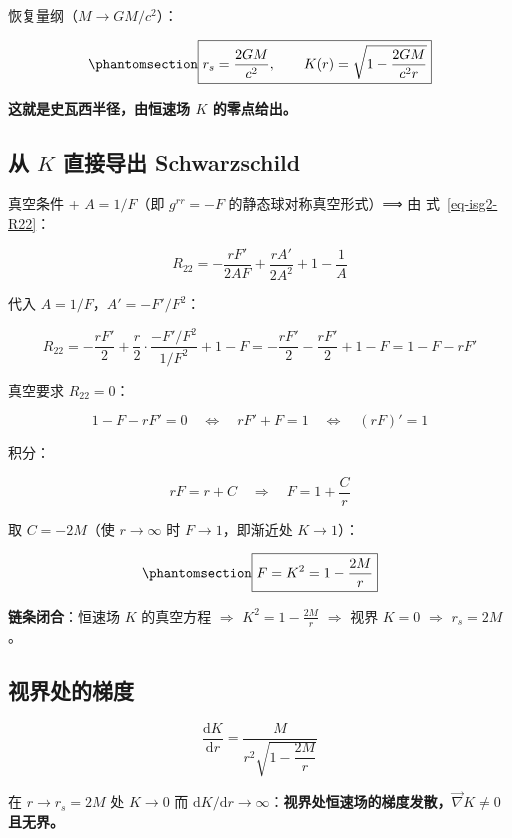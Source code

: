 \documentclass[
  chinese,
  a4paper,
  UTF8,
  12pt,
  oneside,
  openany]{ctexbook}
\theoremstyle{plain}
\theoremstyle{plain}
\theoremstyle{plain}
\theoremstyle{definition}
\theoremstyle{plain}
\theoremstyle{plain}
\theoremstyle{remark}
\begin{document}
恢复量纲（\(M\to GM/c^{2}\)）：

\begin{equation}\protect\phantomsection\label{eq-isg2-rs}{
\boxed{r_s=\frac{2GM}{c^{2}},\qquad K(r)=\sqrt{1-\frac{2GM}{c^{2}r}}}
}\end{equation}

\textbf{这就是史瓦西半径，由恒速场 \(K\) 的零点给出。}

\subsection{\texorpdfstring{从 \(K\) 直接导出
Schwarzschild}{从 K 直接导出 Schwarzschild}}\label{ux4ece-k-ux76f4ux63a5ux5bfcux51fa-schwarzschild}

真空条件 + \(A=1/F\)（即 \(g^{rr}=-F\) 的静态球对称真空形式）⟹ 由
式~\ref{eq-isg2-R22}：

\[
R_{22}=-\frac{rF'}{2AF}+\frac{rA'}{2A^{2}}+1-\frac{1}{A}
\]

代入 \(A=1/F\)，\(A'=-F'/F^{2}\)：

\[
R_{22}=-\frac{rF'}{2}+\frac{r}{2}\cdot\frac{-F'/F^{2}}{1/F^{2}}+1-F
=-\frac{rF'}{2}-\frac{rF'}{2}+1-F=1-F-rF'
\]

真空要求 \(R_{22}=0\)：

\[
1-F-rF'=0\quad\Longleftrightarrow\quad rF'+F=1\quad\Longleftrightarrow\quad (rF)'=1
\]

积分：

\[
rF=r+C\quad\Longrightarrow\quad F=1+\frac{C}{r}
\]

取 \(C=-2M\)（使 \(r\to\infty\) 时 \(F\to1\)，即渐近处 \(K\to1\)）：

\begin{equation}\protect\phantomsection\label{eq-isg2-derive}{
\boxed{F=K^{2}=1-\frac{2M}{r}}
}\end{equation}

\textbf{链条闭合}：恒速场 \(K\) 的真空方程 \(\Longrightarrow\)
\(K^{2}=1-\frac{2M}{r}\) \(\Longrightarrow\) 视界 \(K=0\)
\(\Longrightarrow\) \(r_s=2M\)。

\subsection{视界处的梯度}\label{ux89c6ux754cux5904ux7684ux68afux5ea6}

\[
\frac{\mathrm{d}K}{\mathrm{d}r}=\frac{M}{r^{2}\sqrt{1-\dfrac{2M}{r}}}
\]

在 \(r\to r_s=2M\) 处 \(K\to0\) 而
\(\mathrm{d}K/\mathrm{d}r\to\infty\)：\textbf{视界处恒速场的梯度发散，\(\vec\nabla K\neq0\)
且无界。}
\end{document}
